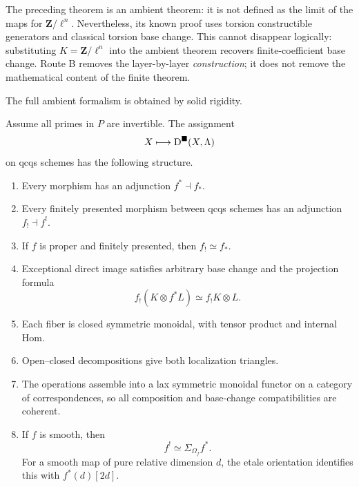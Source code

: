 \begin{foundation}[title={Finite coefficients: definition versus proof}]
The preceding theorem is an ambient theorem: it is not defined as the limit
of the maps for \(\mathbf Z/\ell^n\).  Nevertheless, its known proof uses
torsion constructible generators and classical torsion base change.  This
cannot disappear logically: substituting \(K=\mathbf Z/\ell^n\) into the
ambient theorem recovers finite-coefficient base change.  Route B removes
the layer-by-layer \emph{construction}; it does not remove the mathematical
content of the finite theorem.
\end{foundation}

The full ambient formalism is obtained by solid rigidity.

\begin{theorem}
\label{thm:ambient-solid-six-functors}
Assume all primes in \(P\) are invertible.  The assignment
\[
 X\longmapsto\mathrm D^{\blacksquare}(X,\Lambda)
\]
on qcqs schemes has the following structure.
\begin{enumerate}
\item Every morphism has an adjunction \(f^*\dashv f_*\).
\item Every finitely presented morphism between qcqs schemes has an
      adjunction \(f_!\dashv f^!\).
\item If \(f\) is proper and finitely presented, then \(f_!\simeq f_*\).
\item Exceptional direct image satisfies arbitrary base change and the
      projection formula
      \[
       f_!(K\otimes f^*L)\simeq f_!K\otimes L.
      \]
\item Each fiber is closed symmetric monoidal, with tensor product and
      internal Hom.
\item Open--closed decompositions give both localization triangles.
\item The operations assemble into a lax symmetric monoidal functor on a
      category of correspondences, so all composition and base-change
      compatibilities are coherent.
\item If \(f\) is smooth, then
      \[
       f^!\simeq\Sigma_{\Omega_f}f^*.
      \]
      For a smooth map of pure relative dimension \(d\), the etale
      orientation identifies this with \(f^*(d)[2d]\).
\end{enumerate}
\end{theorem}

